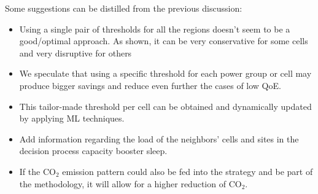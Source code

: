 Some suggestions can be distilled from the previous discussion:
\begin{itemize}
    \item Using a single pair of thresholds for all the regions doesn't seem to be a good/optimal approach. As shown, it can be very conservative for some cells and very disruptive for others
    \item We speculate that using a specific threshold for each power group or cell may produce bigger savings and reduce even further the cases of low QoE.
    \item This tailor-made threshold per cell can be obtained and dynamically updated by applying ML techniques.
    \item Add information regarding the load of the neighbors' cells and sites in the decision process 
    capacity booster sleep.
    \item If the $\text{CO}_2$ emission pattern could also be fed into the strategy and be part of the methodology, it will allow for a higher reduction of $\text{CO}_2$.
\end{itemize}
